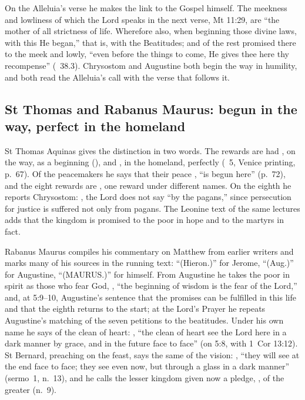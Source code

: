 On the Alleluia's verse he makes the link to the Gospel himself. The meekness
and lowliness of which the Lord speaks in the next verse, Mt 11:29, are ``the
mother of all strictness of life. Wherefore also, when beginning those divine
laws, with this He began,'' that is, with the Beatitudes; and of the rest
promised there to the meek and lowly, ``even before the things to come, He
gives thee here thy recompense'' (\ 38.3). Chrysostom
and Augustine both begin the way in humility, and both read the Alleluia's
call with the verse that follows it.

\subsection{St Thomas and Rabanus Maurus: begun in the way, perfect in the homeland}
\label{sec:beatitudes-thomas}

St Thomas Aquinas gives the distinction in two words. The rewards are had
, on the way, as a beginning (),
and , in the homeland, perfectly (\ 5,
Venice printing, p.~67). Of the peacemakers he says that their peace
, ``is begun here'' (p.~72), and the eight rewards are
, one reward under different names. On the eighth he
reports Chrysostom: , the Lord does not say ``by the
pagans,'' since persecution for justice is suffered not only from pagans. The
Leonine text of the same lectures adds that the kingdom is promised to the
poor in hope and to the martyrs in fact.

Rabanus Maurus compiles his commentary on Matthew from earlier writers and
marks many of his sources in the running text: ``(Hieron.)'' for Jerome,
``(Aug.)'' for Augustine, ``(MAURUS.)'' for himself. From Augustine he takes the
poor in spirit as those who fear God, , ``the beginning of wisdom is the fear of the Lord,'' and, at 5:9--10,
Augustine's sentence that the promises can be fulfilled in this life and that
the eighth returns to the start; at the Lord's Prayer he repeats Augustine's
matching of the seven petitions to the beatitudes. Under his own name he says
of the clean of heart: , ``the clean of heart see the
Lord here in a dark manner by grace, and in the future face to face'' (on 5:8,
with 1~Cor 13:12). St Bernard, preaching on the feast, says the same of the
vision: , ``they will see at the end face to face; they
see even now, but through a glass in a dark manner'' (sermo~1, n.~13), and he
calls the lesser kingdom given now a pledge, , of the
greater (n.~9).

